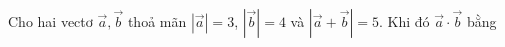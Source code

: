 \begin{ex}
Cho hai vectơ $\overrightarrow a,\overrightarrow b$ thoả mãn $\left|\overrightarrow a\right|=3$, $\left|\overrightarrow b\right|=4$ và $\left|\overrightarrow a+\overrightarrow b\right|=5$. Khi đó $\overrightarrow a\cdot\overrightarrow b$ bằng
\end{ex}
